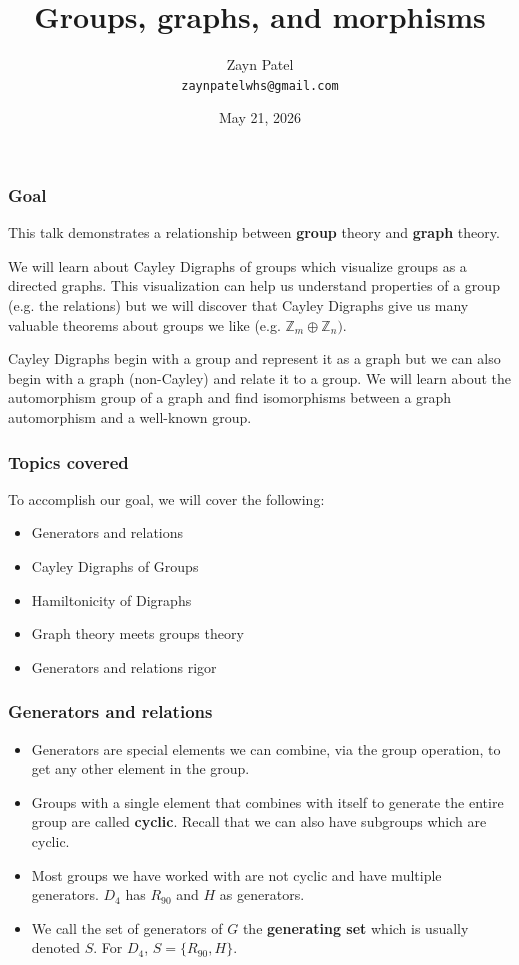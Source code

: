 \documentclass{beamer}
\title{Groups, graphs, and morphisms}
\author{Zayn Patel \\ \texttt{zaynpatelwhs@gmail.com}}
\date{May 21, 2026}
\begin{document}
\frame{\titlepage}

\begin{frame}
\frametitle{Goal}
This talk demonstrates a relationship between \textbf{group} theory and \textbf{graph} theory. \bigskip

\pause

We will learn about Cayley Digraphs of groups which visualize groups as a directed graphs. This visualization can help us understand properties of a group (e.g. the relations) but we will discover that Cayley Digraphs give us many valuable theorems about groups we like (e.g. $\mathbb{Z}_{m} \oplus \mathbb{Z}_{n})$. \bigskip

\pause

Cayley Digraphs begin with a group and represent it as a graph but we can also begin with a graph (non-Cayley) and relate it to a group. We will learn about the automorphism group of a graph and find isomorphisms between a graph automorphism and a well-known group. 
\end{frame}

\begin{frame}
\frametitle{Topics covered}
To accomplish our goal, we will cover the following: \bigskip
    \begin{itemize}
        \item Generators and relations
        \item Cayley Digraphs of Groups
        \item Hamiltonicity of Digraphs
        \item Graph theory meets groups theory
        \item Generators and relations rigor
    \end{itemize}
\end{frame}

\begin{frame}
\frametitle{Generators and relations}
    \begin{itemize}
        \item<1-> Generators are special elements we can combine, via the group operation, to get any other element in the group.
        \item<2-> Groups with a single element that combines with itself to generate the entire group are called \textbf{cyclic}. Recall that we can also have subgroups which are cyclic.
        \item<3-> Most groups we have worked with are not cyclic and have multiple generators. $D_{4}$ has $R_{90}$ and $H$ as generators. 
        \item<4-> We call the set of generators of $G$ the \textbf{generating set} which is usually denoted $S$. For $D_{4}$, $S = \{R_{90}, H\}$.
    \end{itemize}
\end{frame}
\end{document}
